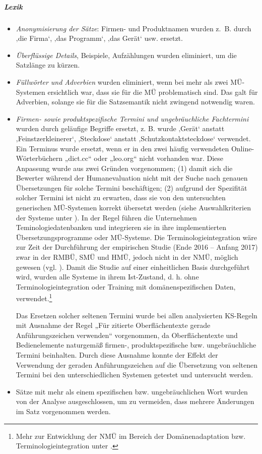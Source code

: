 \subparagraph*{Lexik}
\begin{itemize}
\item \textit{Anonymisierung der Sätze}: Firmen- und Produktnamen wurden z.~B. durch ‚die Firma‘, ‚das Programm‘, ‚das Gerät‘ usw. ersetzt.
\item \textit{Überflüssige Details}, Beispiele, Aufzählungen wurden eliminiert, um die Satzlänge zu kürzen.
\item \textit{Füllwörter und Adverbien} wurden eliminiert, wenn bei mehr als zwei MÜ-Systemen ersichtlich war, dass sie für die MÜ problematisch sind. Das galt für Adverbien, solange sie für die Satzsemantik nicht zwingend notwendig waren.
\item \textit{Firmen- sowie produktspezifische Termini und ungebräuchliche Fachtermini} wurden durch geläufige Begriffe ersetzt, z. B. wurde ‚Gerät‘ anstatt ‚Feinstzerkleinerer‘, ‚Steckdose‘ anstatt ‚Schutzkontaktsteckdose‘ verwendet. Ein Terminus wurde ersetzt, wenn er in den zwei häufig verwendeten Online-Wörterbüchern „dict.cc“ oder „leo.org“ nicht vorhanden war. Diese Anpassung wurde aus zwei Gründen vorgenommen; (1) damit sich die Bewerter während der Humanevaluation nicht mit der Suche nach genauen Übersetzungen für solche Termini beschäftigen; (2) aufgrund der Spezifität solcher Termini ist nicht zu erwarten, dass sie von den untersuchten generischen MÜ-Systemen korrekt übersetzt werden (siehe Auswahlkriterien der Systeme unter ). In der Regel führen die Unternehmen Teminologiedatenbanken und integrieren sie in ihre implementierten Übersetzungsprogramme oder MÜ-Systeme. Die Terminologieintegration wäre zur Zeit der Durchführung der empirischen Studie (Ende 2016 -- Anfang 2017) zwar in der RMBÜ, SMÜ und HMÜ, jedoch nicht in der NMÜ, möglich gewesen (vgl. \citealt{Eisold2017}). Damit die Studie auf einer einheitlichen Basis durchgeführt wird, wurden alle Systeme in ihrem Ist-Zustand, d. h. ohne Terminologieintegration oder Training mit domänenspezifischen Daten, verwendet.\footnote{{{{Mehr zur Entwicklung der NMÜ im Bereich der Domänenadaptation bzw. Terminologieintegration unter .}}}}

Das Ersetzen solcher seltenen Termini wurde bei allen analysierten KS-Regeln mit Ausnahme der Regel „Für zitierte Oberflächentexte gerade Anführungszeichen verwenden“ vorgenommen, da Oberflächentexte und Bedienelemente naturgemäß firmen-, produktspezifische bzw. ungebräuchliche Termini beinhalten. Durch diese Ausnahme konnte der Effekt der Verwendung der geraden Anführungszeichen auf die Übersetzung von seltenen Termini bei den unterschiedlichen Systemen getestet und untersucht werden.

\item Sätze mit mehr als einem spezifischen bzw. ungebräuchlichen Wort wurden von der Analyse ausgeschlossen, um zu vermeiden, dass mehrere Änderungen im Satz vorgenommen werden.
\end{itemize}

